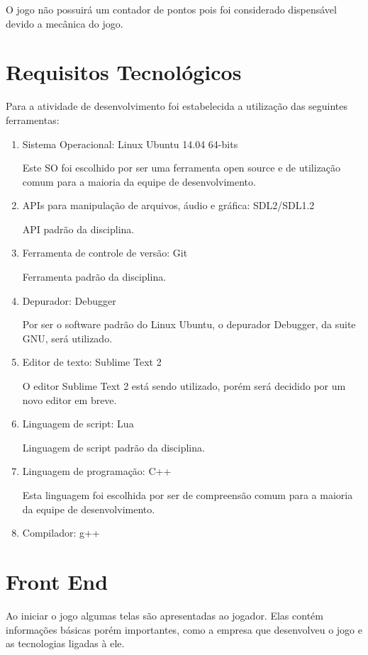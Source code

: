 O jogo não possuirá um contador de pontos pois foi considerado dispensável devido a mecânica do jogo.

\section{Requisitos Tecnológicos}
Para a atividade de desenvolvimento foi estabelecida a utilização das seguintes ferramentas:

\begin{enumerate}
\item Sistema Operacional: Linux Ubuntu 14.04 64-bits

Este SO foi escolhido por ser uma ferramenta open source e de utilização comum para a maioria da equipe de desenvolvimento.

\item APIs para manipulação de arquivos, áudio e gráfica: SDL2/SDL1.2

API padrão da disciplina.

\item Ferramenta de controle de versão: Git

Ferramenta padrão da disciplina.

\item Depurador: Debugger

Por ser o software padrão do Linux Ubuntu, o depurador Debugger, da suite GNU, será utilizado.

\item Editor de texto: Sublime Text 2 

O editor Sublime Text 2 está sendo utilizado, porém será decidido por um novo editor em breve.

\item Linguagem de script: Lua

Linguagem de script padrão da disciplina.

\item Linguagem de programação: C++

Esta linguagem foi escolhida por ser de compreensão comum para a maioria da equipe de desenvolvimento.

\item Compilador: g++

\end{enumerate}

\section{Front End}
Ao iniciar o jogo algumas telas são apresentadas ao jogador. Elas contém informações básicas porém importantes, como a empresa que desenvolveu o jogo e as tecnologias ligadas à ele. 

